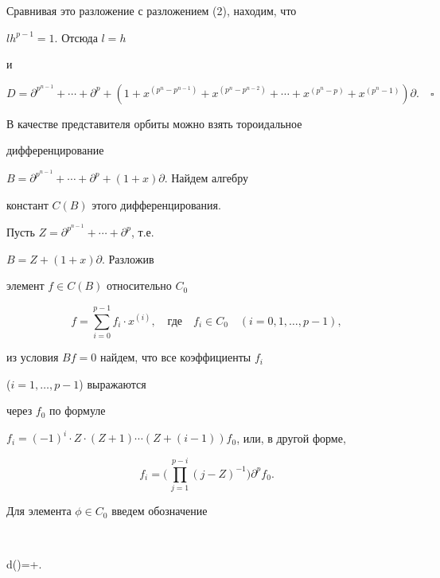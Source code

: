 Сравнивая это разложение с разложением (2), находим, что


$lh^{p-1}=1$. Отсюда $l=h$


и


$$


D=\partial^{p^{n-1}}+\dotsb+\partial^p+(1+x^{(p^n-p^{n-1})}


+x^{(p^n-p^{n-2})}+\dotsb+x^{(p^n-p)}+x^{(p^n-1)})\partial.


\quad\square


$$





\begin{notenonum}


В качестве представителя орбиты можно взять тороидальное


дифференцирование


$B=\partial^{p^{n-1}}+\dotsb+\partial^p+(1+x)\partial$. Найдем алгебру


констант $C(B)$ этого дифференцирования.





Пусть $Z=\partial^{p^{n-1}}+\dotsb+\partial^p$, т.е.


$B=Z+(1+x)\partial$. Разложив


элемент $f\in C(B)$ относительно $C_0$


$$


f=\sum^{p-1}_{i=0}f_i\cdot x^{(i)},\quad


\text{где} \quad f_i\in C_0\quad (i=0,1,\dotsc,p-1),


$$


из условия $Bf=0$ найдем, что все коэффициенты $f_i$


($i=1,\dotsc,p-1$) выражаются


через $f_0$ по формуле


$f_i=(-1)^i\cdot Z\cdot(Z+1)\dotsb(Z+(i-1))f_0$, или, в другой форме,


$$


f_i=\biggl(\,\prod^{p-i}_{j=1}(j-Z)^{-1}\biggr)\partial^pf_0.


$$


Для элемента $\phi\in C_0$ введем обозначение


$$


d(\phi)=\phi+\biggl[\,\sum^{p-1}_{i=1}\biggl\{\biggl(\,


\prod^{p-i}_{j=1}(j-Z)^{-1}\biggr)\partial^p\phi\biggr\}


x^{(i)}\biggr].



\end{notenonum}
